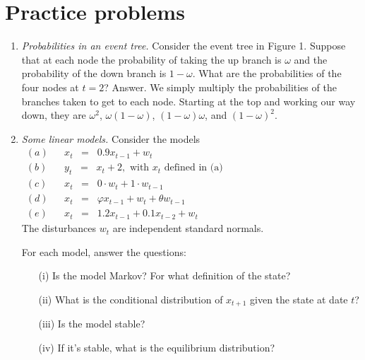 \documentclass[11pt]{article}
\begin{document}


\section*{Practice problems}

\begin{enumerate}
\item {\it Probabilities in an event tree.\/}
Consider the event tree in Figure 1.  Suppose that at each node
the probability of taking the up branch is $\omega$ and the
probability of the down branch is $1-\omega$.
What are the probabilities of the four nodes at $t=2$?
%
Answer.
We simply multiply the probabilities
of the branches taken to get to each node.
Starting at the top and working our way down,
they are $ \omega^2 $, $ \omega (1-\omega)$, $ (1-\omega)\omega $,
and $(1-\omega)^2$.

\item {\it Some linear models.\/}
Consider the models
\begin{eqnarray*}
(a) &&  x_t \;\;=\;\; 0.9 x_{t-1} +  w_t \phantom{xxxxxxxxxxxxxxxxxxxxxxxxxxxxxxxxxxxx}\\
(b) &&  y_t \;\;=\;\; x_t + 2, \mbox{ with $x_t$ defined in (a)} \\
(c) &&  x_t \;\;=\;\; 0 \cdot w_t + 1 \cdot w_{t-1} \\
(d) &&  x_t \;\;=\;\; \varphi x_{t-1} + w_t + \theta  w_{t-1} \\
(e) &&  x_t \;\;=\;\; 1.2 x_{t-1} + 0.1 x_{t-2} +  w_t
\end{eqnarray*}
The disturbances $w_t$ are independent standard normals.

For each model,  answer the questions:
\begin{enumerate}
\item [(i)] Is the model Markov?  For what definition of the state? %
\item [(ii)] What is the conditional distribution of $x_{t+1}$ given
the state at date $t$? %
\item [(iii)] Is the model stable?
\item [(iv)] If it's stable, what is the equilibrium distribution?
\end{enumerate}



\end{enumerate}
\end{document}
